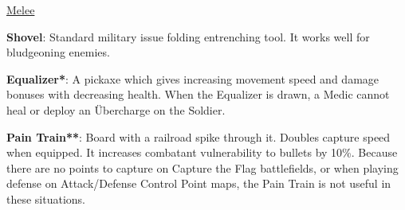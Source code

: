 \newpage

\begin {center}
\underline {Melee}
\end {center}

{\bf Shovel}: Standard military issue folding entrenching tool. It works well for bludgeoning enemies. 

{\bf Equalizer*}: A pickaxe which gives increasing movement speed and damage bonuses with decreasing health. When the Equalizer is drawn, a Medic cannot heal or deploy an Übercharge on the Soldier.

{\bf Pain Train**}: Board with a railroad spike through it. Doubles capture speed when equipped. It increases combatant vulnerability to bullets by 10\%. Because there are no points to capture on Capture the Flag battlefields, or when playing defense on Attack/Defense Control Point maps, the Pain Train is not useful in these situations.

